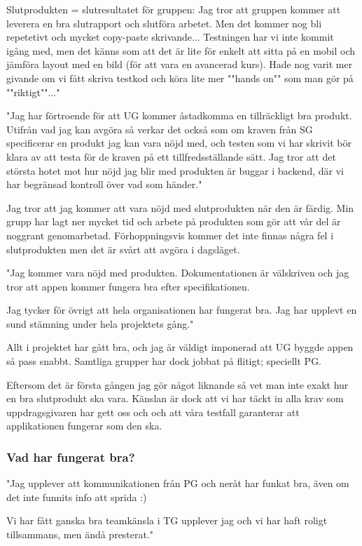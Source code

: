 \documentclass[a4paper]{article}
\begin{document}
Slutprodukten = slutresultatet för gruppen:
Jag tror att gruppen kommer att leverera en bra slutrapport och slutföra arbetet. Men det kommer nog bli repetetivt och mycket copy-paste skrivande...
Testningen har vi inte kommit igång med, men det känns som att det är lite för enkelt att sitta på en mobil och jämföra layout med en bild (för att vara en avancerad kurs). Hade nog varit mer givande om vi fått skriva testkod och köra lite mer ""hands on"" som man gör på ""riktigt""..."

"Jag har förtroende för att UG kommer åstadkomma en tillräckligt bra produkt. Utifrån vad jag kan avgöra så verkar det också som om kraven från SG specificerar en produkt jag kan vara nöjd med, och testen som vi har skrivit bör klara av att testa för de kraven på ett tillfredsställande sätt.
Jag tror att det största hotet mot hur nöjd jag blir med produkten är buggar i backend, där vi har begränsad kontroll över vad som händer."

Jag tror att jag kommer att vara nöjd med slutprodukten när den är färdig. Min grupp har lagt ner mycket tid och arbete på produkten som gör att vår del är noggrant genomarbetad. Förhoppningsvis kommer det inte finnas några fel i slutprodukten men det är svårt att avgöra i dagsläget.  

"Jag kommer vara nöjd med produkten. Dokumentationen är välskriven och jag tror att appen kommer fungera bra efter specifikationen. 

Jag tycker för övrigt att hela organisationen har fungerat bra. Jag har upplevt en sund stämning under hela projektets gång."

Allt i projektet har gått bra, och jag är väldigt imponerad att UG byggde appen så pass snabbt. Samtliga grupper har dock jobbat på flitigt; speciellt PG. 

Eftersom det är första gången jag gör något liknande så vet man inte exakt hur en bra slutprodukt ska vara. Känslan är dock att vi har täckt in alla krav som uppdragsgivaren har gett oss och och att våra testfall garanterar att applikationen fungerar som den ska.


\subsubsection{Vad har fungerat bra?}
"Jag upplever att kommunikationen från PG och neråt har funkat bra, även om det inte funnits info att sprida :)

Vi har fått ganska bra teamkänsla i TG upplever jag och vi har haft roligt tillsammans, men ändå presterat."
\end{document}
